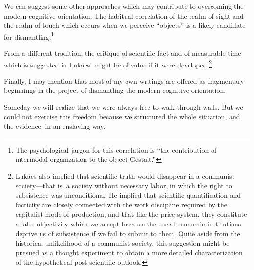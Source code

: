 We can suggest some other approaches which may contribute to overcoming the modern cognitive orientation. The habitual correlation of the realm of sight and the realm of touch which occurs when we perceive \enquote{objects} is a likely candidate for dismantling.\footnote{The psychological jargon for this correlation is \enquote{the contribution of intermodal organization to the object Gestalt.}}

From a different tradition, the critique of scientific fact and of measurable time which is suggested in Luk\'{a}cs'  might be of value if it were developed.\footnote{Luk\'{a}cs also implied that scientific truth would disappear in a communist society---that is, a society without necessary labor, in which the right to subsistence was unconditional. He implied that scientific quantification and facticity are closely connected with the work discipline required by the capitalist mode of production; and that like the price system, they constitute a false objectivity which we accept because the social economic institutions deprive us of subsistence if we fail to submit to them. Quite aside from the historical unlikelihood of a communist society, this suggestion might be pursued as a thought experiment to obtain a more detailed characterization of the hypothetical post-scientific outlook.}

Finally, I may mention that most of my own writings are offered as fragmentary beginnings in the project of dismantling the modern cognitive orientation. 

Someday we will realize that we were always free to walk through walls. But we could not exercise this freedom because we structured the whole situation, and the evidence, in an enslaving way. 
